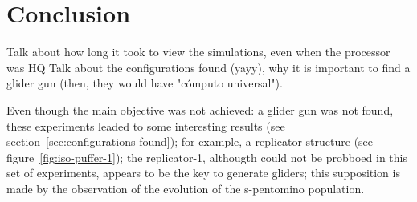 
\section{Conclusion}
Talk about how long it took to view the simulations, even when the processor was HQ
Talk about the configurations found (yayy), why it is important to find a
glider gun (then, they would have "cómputo universal").

Even though the main objective was not achieved: a glider gun was not found,
these experiments leaded to some interesting results (see
section~\ref{sec:configurations-found}); for example, a replicator structure
(see figure~\ref{fig:iso-puffer-1}); the replicator-1, althougth could not be
probboed in this set of experiments, appears to be the key to generate gliders;
this supposition is made by the observation of the evolution of the s-pentomino population.
